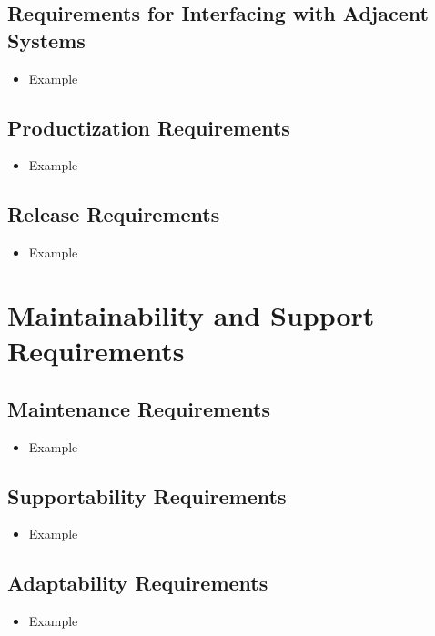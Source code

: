 \documentclass[12pt]{article}
\begin{document}
  \subsection{Requirements for Interfacing with Adjacent Systems}
    \begin{itemize}
      \item Example
    \end{itemize}

  \subsection{Productization Requirements}
    \begin{itemize}
      \item Example
    \end{itemize}

  \subsection{Release Requirements}
    \begin{itemize}
      \item Example
    \end{itemize}

\section{Maintainability and Support Requirements}
  \subsection{Maintenance Requirements}
    \begin{itemize}
      \item Example
    \end{itemize}

  \subsection{Supportability Requirements}
    \begin{itemize}
      \item Example
    \end{itemize}

  \subsection{Adaptability Requirements}
    \begin{itemize}
      \item Example
    \end{itemize}
\end{document}
